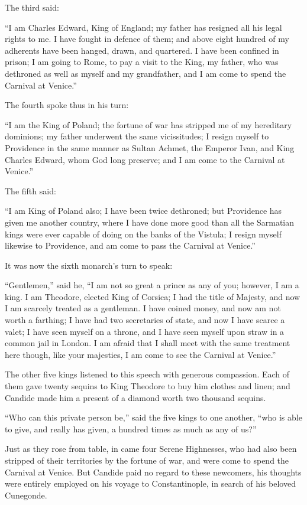 The third said:

``I am Charles Edward, King of England; my father has resigned all his legal rights to me. I have fought in defence of them; and above eight hundred of my adherents have been hanged, drawn, and quartered. I have been confined in prison; I am going to Rome, to pay a visit to the King, my father, who was dethroned as well as myself and my grandfather, and I am come to spend the Carnival at Venice.''

The fourth spoke thus in his turn:

``I am the King of Poland; the fortune of war has stripped me of my hereditary dominions; my father underwent the same vicissitudes; I resign myself to Providence in the same manner as Sultan Achmet, the Emperor Ivan, and King Charles Edward, whom God long preserve; and I am come to the Carnival at Venice.''

The fifth said:

``I am King of Poland also; I have been twice dethroned; but Providence has given me another country, where I have done more good than all the Sarmatian kings were ever capable of doing on the banks of the Vistula; I resign myself likewise to Providence, and am come to pass the Carnival at Venice.''

It was now the sixth monarch's turn to speak:

``Gentlemen,'' said he, ``I am not so great a prince as any of you; however, I am a king. I am Theodore, elected King of Corsica; I had the title of Majesty, and now I am scarcely treated as a gentleman. I have coined money, and now am not worth a farthing; I have had two secretaries of state, and now I have scarce a valet; I have seen myself on a throne, and I have seen myself upon straw in a common jail in London. I am afraid that I shall meet with the same treatment here though, like your majesties, I am come to see the Carnival at Venice.''

The other five kings listened to this speech with generous compassion. Each of them gave twenty sequins to King Theodore to buy him clothes and linen; and Candide made him a present of a diamond worth two thousand sequins.

``Who can this private person be,'' said the five kings to one another, ``who is able to give, and really has given, a hundred times as much as any of us?''

Just as they rose from table, in came four Serene Highnesses, who had also been stripped of their territories by the fortune of war, and were come to spend the Carnival at Venice. But Candide paid no regard to these newcomers, his thoughts were entirely employed on his voyage to Constantinople, in search of his beloved Cunegonde.


